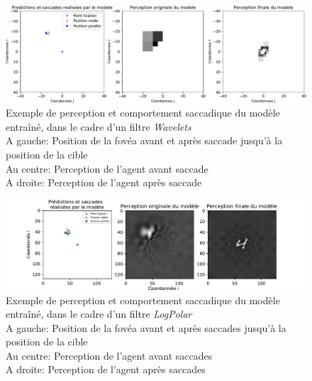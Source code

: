 \begin{figure}[th]
\centering
\includegraphics[scale=0.5]{Figures/saccades_wavelets}
\decoRule
\caption[Figure]{Exemple de perception et comportement saccadique du modèle entraîné, dans le cadre d'un filtre \textit{Wavelets}
\\ A gauche: Position de la fovéa avant et après saccade jusqu'à la position de la cible
\\ Au centre: Perception de l'agent avant saccade
\\ A droite: Perception de l'agent après saccade}
\label{fig:saccades_wavelets}
\end{figure}

\begin{figure}[th]
\centering
\includegraphics[scale=0.75]{Figures/saccades_logpolar}
\decoRule
\caption[Figure]{Exemple de perception et comportement saccadique du modèle entraîné, dans le cadre d'un filtre \textit{LogPolar}
\\ A gauche: Position de la fovéa avant et après saccades jusqu'à la position de la cible
\\ Au centre: Perception de l'agent avant saccades
\\ A droite: Perception de l'agent après saccades}
\label{fig:saccades_logpolar}
\end{figure}

